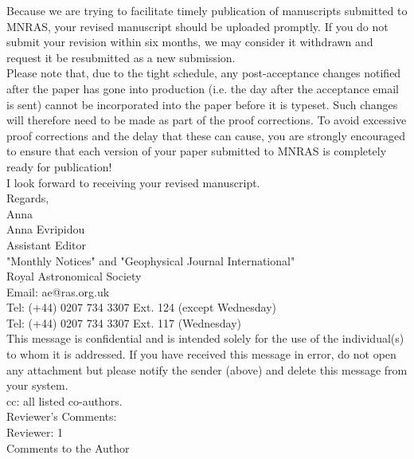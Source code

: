 \documentclass[10pt,a4paper]{article}
\begin{document}
Because we are trying to facilitate timely publication of manuscripts submitted to
MNRAS, your revised manuscript should be uploaded promptly. If you do not submit
your revision within six months, we may consider it withdrawn and request it be
resubmitted as a new submission.\\

Please note that, due to the tight schedule, any post-acceptance changes notified
after the paper has gone into production (i.e. the day after the acceptance email is
sent) cannot be incorporated into the paper before it is typeset. Such changes will
therefore need to be made as part of the proof corrections. To avoid excessive proof
corrections and the delay that these can cause, you are strongly encouraged to
ensure that each version of your paper submitted to MNRAS is completely ready for
publication!\\

I look forward to receiving your revised manuscript.\\

Regards,\\

Anna\\

\noindent Anna Evripidou\\
Assistant Editor\\
"Monthly Notices" and "Geophysical Journal International"\\
Royal Astronomical Society\\
Email: ae@ras.org.uk\\
Tel: (+44) 0207 734 3307 Ext. 124 (except Wednesday)\\
Tel: (+44) 0207 734 3307 Ext. 117 (Wednesday)\\


This message is confidential and is intended solely for the use of the individual(s)
to whom it is addressed.  If you have received this message in error, do not open
any attachment but please notify the sender (above) and delete this message from
your system.\\

cc: all listed co-authors.\\

\noindent Reviewer's Comments:\\
Reviewer: 1\\

Comments to the Author\\
\end{document}
